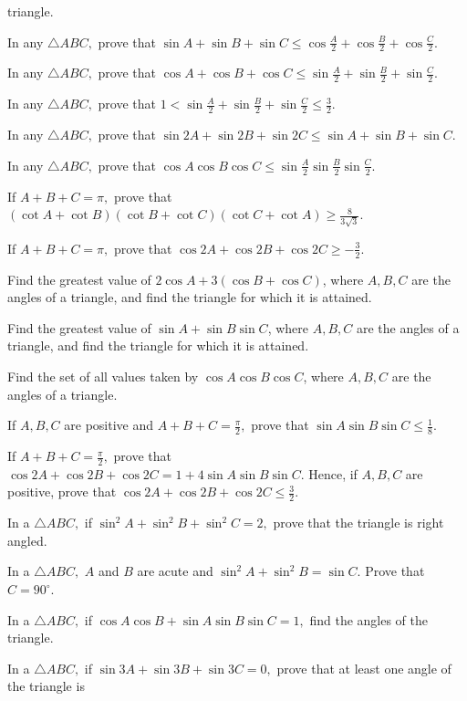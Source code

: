   triangle.
\item In any $\triangle ABC,$ prove that $\sin A + \sin B + \sin C \leq \cos\frac{A}{2} + \cos\frac{B}{2} +
  \cos\frac{C}{2}$.
\item In any $\triangle ABC,$ prove that $\cos A + \cos B + \cos C \leq \sin\frac{A}{2} + \sin\frac{B}{2} +
  \sin\frac{C}{2}$.
\item In any $\triangle ABC,$ prove that $1 < \sin\frac{A}{2} + \sin\frac{B}{2} + \sin\frac{C}{2} \leq \frac{3}{2}$.
\item In any $\triangle ABC,$ prove that $\sin 2A + \sin 2B + \sin 2C \leq \sin A + \sin B + \sin C$.
\item In any $\triangle ABC,$ prove that $\cos A\cos B\cos C \leq \sin\frac{A}{2}\sin\frac{B}{2}\sin\frac{C}{2}$.
\item If $A + B + C = \pi,$ prove that $(\cot A + \cot B)(\cot B + \cot C)(\cot C + \cot A) \geq \frac{8}{3\sqrt{3}}$.
\item If $A + B + C = \pi,$ prove that $\cos 2A + \cos 2B + \cos 2C \geq -\frac{3}{2}$.
\item Find the greatest value of $2\cos A + 3(\cos B + \cos C)$, where $A, B, C$ are the angles of a triangle, and find
  the triangle for which it is attained.
\item Find the greatest value of $\sin A + \sin B\sin C$, where $A, B, C$ are the angles of a triangle, and find the
  triangle for which it is attained.
\item Find the set of all values taken by $\cos A\cos B\cos C$, where $A, B, C$ are the angles of a triangle.
\item If $A, B, C$ are positive and $A + B + C = \frac{\pi}{2},$ prove that $\sin A\sin B\sin C \leq \frac{1}{8}$.
\item If $A + B + C = \frac{\pi}{2},$ prove that $\cos 2A + \cos 2B + \cos 2C = 1 + 4\sin A\sin B\sin C$. Hence, if $A, B,
  C$ are positive, prove that $\cos 2A + \cos 2B + \cos 2C \leq \frac{3}{2}$.
\item In a $\triangle ABC,$ if $\sin^2A + \sin^2B + \sin^2C = 2,$ prove that the triangle is right angled.
\item In a $\triangle ABC,$ $A$ and $B$ are acute and $\sin^2A + \sin^2B = \sin C$. Prove that $C = 90^\circ$.
\item In a $\triangle ABC,$ if $\cos A\cos B + \sin A\sin B\sin C = 1,$ find the angles of the triangle.
\item In a $\triangle ABC,$ if $\sin 3A + \sin 3B + \sin 3C = 0,$ prove that at least one angle of the triangle is
